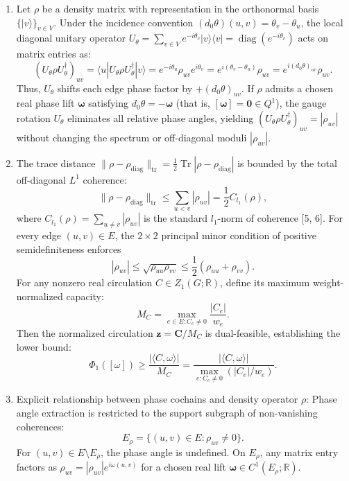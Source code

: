 \documentclass[
]{article}
\providecommand{\tightlist}{%
  \setlength{\itemsep}{0pt}\setlength{\parskip}{0pt}}
\providecommand{\tightlist}{%
  \setlength{\itemsep}{0pt}\setlength{\parskip}{0pt}}
\begin{document}
\begin{enumerate}
\def\labelenumi{\arabic{enumi}.}
\tightlist
\item
  Let \(\rho\) be a density matrix with representation in the orthonormal basis \(\{|v\rangle\}_{v \in V}\).
  Under the incidence convention \((d_0 \theta)(u,v) = \theta_v - \theta_u\), the local diagonal unitary operator
  \(U_\theta = \sum_{v \in V} e^{-i \theta_v} |v\rangle\langle v| = \operatorname{diag}(e^{-i \theta_v})\)
  acts on matrix entries as:
  \[(U_\theta \rho U_\theta^\dagger)_{uv} = \langle u | U_\theta \rho U_\theta^\dagger | v \rangle = e^{-i \theta_u} \rho_{uv} e^{i \theta_v} = e^{i (\theta_v - \theta_u)} \rho_{uv} = e^{i (d_0 \theta)_{uv}} \rho_{uv}.\]
  Thus, \(U_\theta\) shifts each edge phase factor by \(+ (d_0 \theta)_{uv}\). If \(\rho\) admits a chosen real phase lift
  \(\boldsymbol{\omega}\) satisfying \(d_0 \theta = -\boldsymbol{\omega}\) (that is, \([\boldsymbol{\omega}] = \mathbf{0} \in Q^1\)), the gauge rotation \(U_\theta\) eliminates
  all relative phase angles, yielding \((U_\theta \rho U_\theta^\dagger)_{uv} = |\rho_{uv}|\) without changing the spectrum
  or off-diagonal moduli \(|\rho_{uv}|\).
\item
  The trace distance \(\|\rho - \rho_{\text{diag}}\|_{\operatorname{tr}} = \frac{1}{2} \operatorname{Tr}|\rho - \rho_{\text{diag}}|\)
  is bounded by the total off-diagonal \(L^1\) coherence:
  \[\|\rho - \rho_{\text{diag}}\|_{\operatorname{tr}} \le \sum_{u < v} |\rho_{uv}| = \frac{1}{2} C_{l_1}(\rho),\]
  where \(C_{l_1}(\rho) = \sum_{u \ne v} |\rho_{uv}|\) is the standard \(l_1\)-norm of coherence {[}5, 6{]}.
  For every edge \((u,v) \in E\), the \(2 \times 2\) principal minor condition of
  positive semidefiniteness enforces
  \[|\rho_{uv}| \le \sqrt{\rho_{uu} \rho_{vv}} \le \frac{1}{2}(\rho_{uu} + \rho_{vv}).\]
  For any nonzero real circulation \(C \in Z_1(G;\mathbb{R})\), define its maximum weight-normalized capacity:
  \[M_C = \max_{e \in E: C_e \ne 0} \frac{|C_e|}{w_e}.\]
  Then the normalized circulation \(\mathbf{z} = \mathbf{C} / M_C\) is dual-feasible, establishing the lower bound:
  \[\Phi_1([\omega]) \ge \frac{|\langle C, \omega \rangle|}{M_C} = \frac{|\langle C, \omega \rangle|}{\max_{e: C_e \ne 0} (|C_e| / w_e)}.\]
\item
  Explicit relationship between phase cochains and density operator \(\rho\):
  Phase angle extraction is restricted to the support subgraph of non-vanishing coherences:
  \[E_\rho = \{(u,v) \in E : \rho_{uv} \ne 0\}.\]
  For \((u,v) \in E \setminus E_\rho\), the phase angle is undefined. On \(E_\rho\), any matrix entry factors as \(\rho_{uv} = |\rho_{uv}| e^{i \omega(u,v)}\) for a chosen real lift \(\boldsymbol{\omega} \in C^1(E_\rho; \mathbb{R})\).

\end{enumerate}
\end{document}
